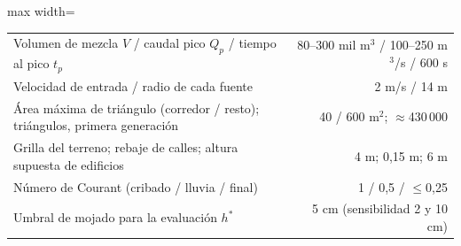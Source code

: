 \begin{table}[htbp]
\begin{adjustbox}{max width=\textwidth}
\begin{tabular}{lrrrrrrr}
\multicolumn{5}{l}{Volumen de mezcla $V$ / caudal pico $Q_p$ / tiempo al pico $t_p$} & \multicolumn{3}{r}{80--300 mil m$^3$ / 100--250 m$^3$/s / 600 s}\\
\multicolumn{5}{l}{Velocidad de entrada / radio de cada fuente} & \multicolumn{3}{r}{2 m/s / 14 m}\\
\multicolumn{5}{l}{Área máxima de triángulo (corredor / resto); triángulos, primera generación} & \multicolumn{3}{r}{40 / 600 m$^2$; $\approx$430\,000}\\
\multicolumn{5}{l}{Grilla del terreno; rebaje de calles; altura supuesta de edificios} & \multicolumn{3}{r}{4 m; 0,15 m; 6 m}\\
\multicolumn{5}{l}{Número de Courant (cribado / lluvia / final)} & \multicolumn{3}{r}{1 / 0,5 / $\le$0,25}\\
\multicolumn{5}{l}{Umbral de mojado para la evaluación $h^*$} & \multicolumn{3}{r}{5 cm (sensibilidad 2 y 10 cm)}\\
\bottomrule\end{tabular}\end{adjustbox}\end{table}
